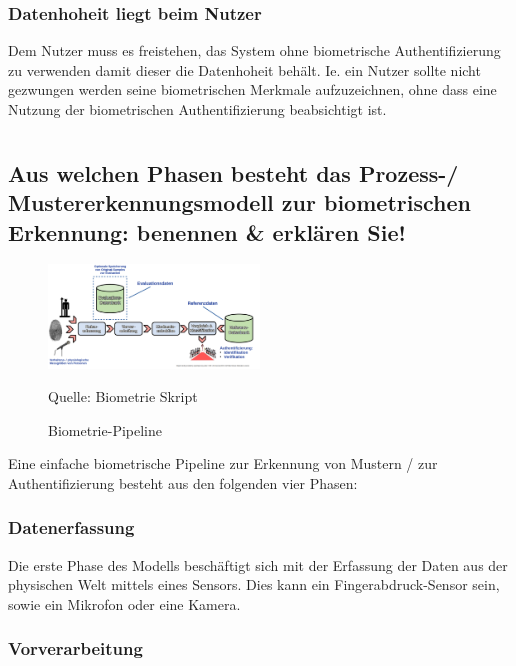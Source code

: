 \documentclass{article}
\newcommand{\figuresource}[1]{
	\begin{center}Quelle: {#1}\end{center}
}
\begin{document}
\subsubsection*{Datenhoheit liegt beim Nutzer}

Dem Nutzer muss es freistehen, das System ohne biometrische Authentifizierung zu verwenden damit dieser 
die Datenhoheit behält. Ie. ein Nutzer sollte nicht gezwungen werden seine biometrischen Merkmale 
aufzuzeichnen, ohne dass eine Nutzung der biometrischen Authentifizierung beabsichtigt ist.

\newpage

\section{}

\subsection{Aus welchen Phasen besteht das Prozess-/ Mustererkennungsmodell zur biometrischen Erkennung: benennen \& erklären Sie!}

\begin{figure}[ht]
	\includegraphics[width=0.5\textwidth]{assets/pipeline-id}
	\centering
	\caption{Biometrie-Pipeline}
	\figuresource{Biometrie Skript}
\end{figure}

Eine einfache biometrische Pipeline zur Erkennung von Mustern / zur Authentifizierung besteht aus den 
folgenden vier Phasen:

\subsubsection*{Datenerfassung}

Die erste Phase des Modells beschäftigt sich mit der Erfassung der Daten aus der physischen Welt mittels 
eines Sensors. Dies kann ein Fingerabdruck-Sensor sein, sowie ein Mikrofon oder eine Kamera.

\subsubsection*{Vorverarbeitung}
\end{document}
